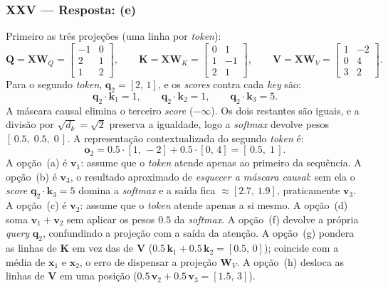 \documentclass{dlproblemset}
\begin{document}
\subsubsection*{XXV — Resposta: (e)}
Primeiro as três projeções (uma linha por \textit{token}):
\[
\mathbf{Q} = \mathbf{X}\mathbf{W}_Q = \begin{bmatrix} -1 & 0 \\ 2 & 1 \\ 1 & 2 \end{bmatrix},
\qquad
\mathbf{K} = \mathbf{X}\mathbf{W}_K = \begin{bmatrix} 0 & 1 \\ 1 & -1 \\ 2 & 1 \end{bmatrix},
\qquad
\mathbf{V} = \mathbf{X}\mathbf{W}_V = \begin{bmatrix} 1 & -2 \\ 0 & 4 \\ 3 & 2 \end{bmatrix}.
\]
Para o segundo \textit{token}, $\mathbf{q}_2 = [2,\,1]$, e os \textit{scores} contra
cada \textit{key} são:
\[
\mathbf{q}_2 \cdot \mathbf{k}_1 = 1, \qquad \mathbf{q}_2 \cdot \mathbf{k}_2 = 1, \qquad \mathbf{q}_2 \cdot \mathbf{k}_3 = 5.
\]
A máscara causal elimina o terceiro \textit{score} ($-\infty$). Os dois restantes são
iguais, e a divisão por $\sqrt{d_k} = \sqrt{2}$ preserva a igualdade, logo a
\textit{softmax} devolve pesos $[\,0.5,\;0.5,\;0\,]$. A representação contextualizada
do segundo \textit{token} é:
\[
\mathbf{o}_2 = 0.5 \cdot [1,\,-2] + 0.5 \cdot [0,\,4] = [\,0.5,\;1\,].
\]
A opção~(a) é $\mathbf{v}_1$: assume que o \textit{token} atende apenas ao primeiro da
sequência. A opção~(b) é $\mathbf{v}_3$, o resultado aproximado de \emph{esquecer a
máscara causal}: sem ela o \textit{score} $\mathbf{q}_2 \cdot \mathbf{k}_3 = 5$ domina a
\textit{softmax} e a saída fica $\approx [2.7,\,1.9]$, praticamente $\mathbf{v}_3$. A
opção~(c) é $\mathbf{v}_2$: assume que o \textit{token} atende apenas a si mesmo. A
opção~(d) soma $\mathbf{v}_1 + \mathbf{v}_2$ sem aplicar os pesos $0.5$ da
\textit{softmax}. A opção~(f) devolve a própria \textit{query} $\mathbf{q}_2$,
confundindo a projeção com a saída da atenção. A opção~(g) pondera as linhas de
$\mathbf{K}$ em vez das de $\mathbf{V}$
($0.5\,\mathbf{k}_1 + 0.5\,\mathbf{k}_2 = [0.5,\,0]$); coincide com a média de
$\mathbf{x}_1$ e $\mathbf{x}_2$, o erro de dispensar a projeção $\mathbf{W}_V$. A
opção~(h) desloca as linhas de $\mathbf{V}$ em uma posição
($0.5\,\mathbf{v}_2 + 0.5\,\mathbf{v}_3 = [1.5,\,3]$).
\end{document}
